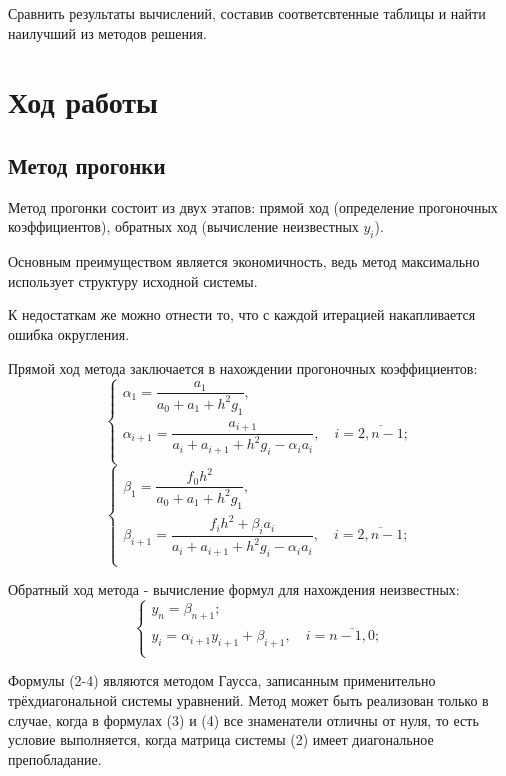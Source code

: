 \documentclass[a4paper,12pt]{article}
\begin{document}
{Сравнить результаты вычислений, составив соответсвтенные таблицы и найти наилуч\-ший из методов решения.
\section{Ход работы}
\subsection{Метод прогонки}
\hspace*{1.25cm} Метод прогонки состоит из двух этапов: прямой ход (определение прогоночных коэффициентов), 
обратных ход (вычисление неизвестных $y_i$).

Основным преимуществом является экономичность, ведь метод максимально использует структуру исходной системы.

К недостаткам же можно отнести то, что с каждой итерацией накапливается ошибка округления.

Прямой ход метода заключается в нахождении прогоночных коэффициентов: 
\begin{equation}
    \begin{cases}
        \alpha_1 = \dfrac{a_1}{a_0 + a_1 + h^2g_1},\\
        \alpha_{i+1} = \dfrac{a_{i+1}}{a_i + a_{i+1} + h^2g_i - \alpha_ia_i}, \quad i = \overline{2, n - 1};\\
    \end{cases}
\end{equation}
\begin{equation}
    \begin{cases}
        \beta_1 = \dfrac{f_0h^2}{a_0 + a_1 + h^2g_1},\\
        \beta_{i+1} = \dfrac{f_ih^2 + \beta_ia_i}{a_i + a_{i+1} + h^2g_i - \alpha_ia_i}, \quad i = \overline{2, n - 1};\\
    \end{cases}
\end{equation}

Обратный ход метода - вычисление формул для нахождения неизвестных:
\begin{equation}
    \begin{cases}
        y_n = \beta_{n+1};\\
        y_i = \alpha_{i+1}y_{i+1} + \beta_{i+1}, \quad i = \overline{n-1, 0};\\
    \end{cases}
\end{equation}

Формулы (2-4) являются методом Гаусса, записанным применительно трёх\-диаго\-наль\-ной системы уравнений. 
Метод может быть реализован только в случае, когда в формулах (3) и (4) все знаменатели отличны от нуля, 
то есть условие выполняется, когда матрица системы (2) имеет диагональное препобладание.

}
\end{document}
